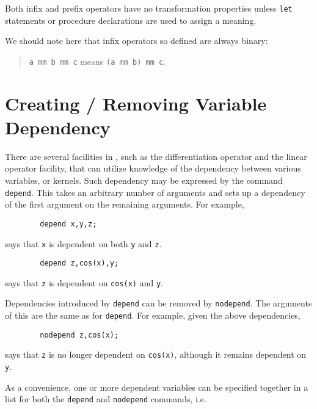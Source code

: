 Both infix and prefix operators have no transformation
properties unless \texttt{let} statements or procedure
declarations are used to assign a meaning.

We should note here that infix operators so defined are always binary:
\begin{quote}
\hspace{0.2in}\texttt{a mm b mm c}\hspace{.3in} means \hspace{.3in}
\texttt{(a mm b) mm c}.
\end{quote}

\section{Creating / Removing Variable Dependency}
\label{sec:dependency}
\hypertarget{command:DEPEND}{}
\hypertarget{command:NODEPEND}{}

There are several facilities in {\REDUCE}, such as the differentiation
operator and the linear operator facility, that
can utilize knowledge of the dependency between various variables, or
kernels.  Such dependency may be expressed by the command
\texttt{depend}.
This takes an arbitrary number of arguments and
sets up a dependency of the first argument on the remaining arguments.
For example,
\begin{verbatim}
        depend x,y,z;
\end{verbatim}
says that \texttt{x} is dependent on both \texttt{y} and \texttt{z}.
\begin{verbatim}
        depend z,cos(x),y;
\end{verbatim}
says that \texttt{z} is dependent on \texttt{cos(x)} and \texttt{y}.

Dependencies introduced by \texttt{depend} can be removed by \texttt{nodepend}.
 The arguments of this are the same as for \texttt{depend}.
For example, given the above dependencies,
\begin{verbatim}
        nodepend z,cos(x);
\end{verbatim}
says that \texttt{z} is no longer dependent on \texttt{cos(x)}, although it remains
dependent on \texttt{y}.

As a convenience, one or more dependent variables can be specified
together in a list for both the \texttt{depend} and \texttt{nodepend}
commands, i.e.

